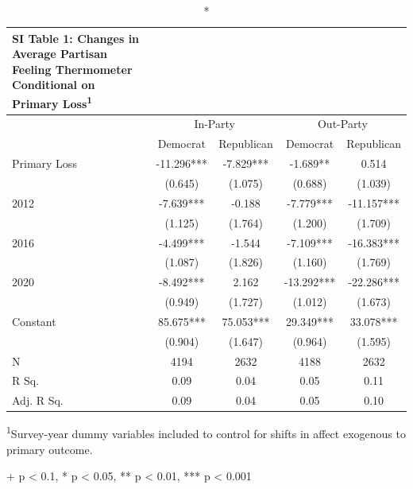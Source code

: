 \documentclass[
]{article}
\begin{document}
\captionsetup[table]{labelformat=empty,skip=1pt}
\begin{longtable}{lcccc}
\caption*{
{\large \textbf{SI Table 1:} Changes in Average Partisan Feeling Thermometer  Conditional on Primary Loss\textsuperscript{1}}
} \\ 
\toprule
 & \multicolumn{2}{c}{In-Party} & \multicolumn{2}{c}{Out-Party} \\ 
 \cmidrule(lr){2-3} \cmidrule(lr){4-5}
  & Democrat & Republican & Democrat  & Republican  \\ 
\midrule
Primary Loss & -11.296*** & -7.829*** & -1.689** & 0.514 \\ 
 & (0.645) & (1.075) & (0.688) & (1.039) \\ 
2012 & -7.639*** & -0.188 & -7.779*** & -11.157*** \\ 
 & (1.125) & (1.764) & (1.200) & (1.709) \\ 
2016 & -4.499*** & -1.544 & -7.109*** & -16.383*** \\ 
 & (1.087) & (1.826) & (1.160) & (1.769) \\ 
2020 & -8.492*** & 2.162 & -13.292*** & -22.286*** \\ 
 & (0.949) & (1.727) & (1.012) & (1.673) \\ 
Constant & 85.675*** & 75.053*** & 29.349*** & 33.078*** \\ 
 & (0.904) & (1.647) & (0.964) & (1.595) \\ 
N & 4194 & 2632 & 4188 & 2632 \\ 
R Sq. & 0.09 & 0.04 & 0.05 & 0.11 \\ 
Adj. R Sq. & 0.09 & 0.04 & 0.05 & 0.10 \\ 
 \bottomrule
\end{longtable}
\vspace{-5mm}
\begin{minipage}{\linewidth}
\textsuperscript{1}Survey-year dummy variables included to  control for shifts in affect exogenous to primary outcome. \\ 
\end{minipage}
\begin{minipage}{\linewidth}
+ p < 0.1, * p < 0.05, ** p < 0.01, *** p < 0.001\\ 
\end{minipage}
\end{document}
